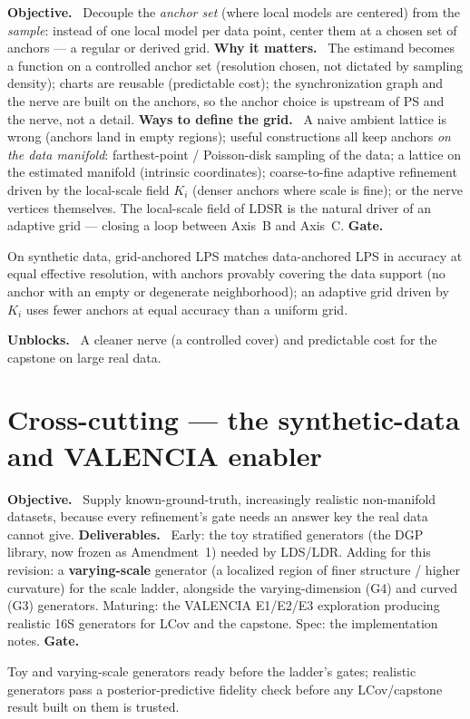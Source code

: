 \documentclass[11pt]{article}
\newcommand{\field}[1]{\smallskip\noindent\textbf{\textsf{#1.}}\ }
\begin{document}
\field{Objective} Decouple the \emph{anchor set} (where local models are centered)
from the \emph{sample}: instead of one local model per data point, center them at a
chosen set of anchors --- a regular or derived grid.
\field{Why it matters} The estimand becomes a function on a controlled anchor set
(resolution chosen, not dictated by sampling density); charts are reusable
(predictable cost); the synchronization graph and the nerve are built on the anchors,
so the anchor choice is upstream of PS and the nerve, not a detail.
\field{Ways to define the grid} A naive ambient lattice is wrong (anchors land in
empty regions); useful constructions all keep anchors \emph{on the data manifold}:
farthest-point / Poisson-disk sampling of the data; a lattice on the estimated
manifold (intrinsic coordinates); coarse-to-fine adaptive refinement driven by the
local-scale field $K_i$ (denser anchors where scale is fine); or the nerve vertices
themselves. The local-scale field of LDSR is the natural driver of an adaptive grid
--- closing a loop between Axis~B and Axis~C.
\field{Gate} \begin{gate} On synthetic data, grid-anchored LPS matches
data-anchored LPS in accuracy at equal effective resolution, with anchors provably
covering the data support (no anchor with an empty or degenerate neighborhood); an
adaptive grid driven by $K_i$ uses fewer anchors at equal accuracy than a uniform
grid.\end{gate}
\field{Unblocks} A cleaner nerve (a controlled cover) and predictable cost for the
capstone on large real data.

\section{Cross-cutting --- the synthetic-data and VALENCIA enabler}\label{sec:data}

\field{Objective} Supply known-ground-truth, increasingly realistic non-manifold
datasets, because every refinement's gate needs an answer key the real data cannot
give.
\field{Deliverables} Early: the toy stratified generators (the DGP library, now
frozen as Amendment~1) needed by LDS/LDR. Adding for this revision: a
\textbf{varying-scale} generator (a localized region of finer structure / higher
curvature) for the scale ladder, alongside the varying-dimension (G4) and curved
(G3) generators. Maturing: the VALENCIA E1/E2/E3 exploration producing realistic
16S generators for LCov and the capstone. Spec: the implementation notes.
\field{Gate} \begin{gate} Toy and varying-scale generators ready before the ladder's
gates; realistic generators pass a posterior-predictive fidelity check before any
LCov/capstone result built on them is trusted.\end{gate}
\end{document}

